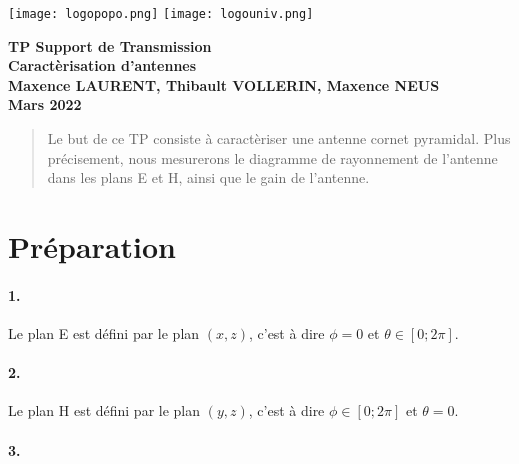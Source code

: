 \documentclass[oneside,a4paper,12pt]{article}
\begin{document}
	\begin{titlepage}
		\texttt{[image: logopopo.png]}
		\hspace*{\fill}
		\texttt{[image: logouniv.png]}
		
		\begin{center}
			\vspace{1cm}
			\textbf{TP Support de Transmission}\\
			\textbf{Caractèrisation d'antennes}\\
			\vspace{1cm}
			\textbf{Maxence LAURENT, Thibault VOLLERIN, Maxence NEUS}\\
			\vspace{3cm}
			\vspace{\fill}
			\textbf{Mars 2022}\\
		\end{center}
	\end{titlepage}
	
	\tableofcontents
	
	\vspace{5cm}
	
	\begin{abstract}
	Le but de ce TP consiste à caractèriser une antenne cornet pyramidal.
	Plus précisement, nous mesurerons le diagramme de rayonnement de l'antenne dans les plans E et H, ainsi que le gain de l'antenne. 
 	\end{abstract}

	\newpage

	\section{Préparation}
	
	\paragraph{1.} 
	Le plan E est défini par le plan $ (x, z) $, c'est à dire $ \phi = 0 $ et $ \theta \in [0; 2 \pi] $.
	
	\paragraph{2.} 
	Le plan H est défini par le plan $ (y, z) $, c'est à dire $ \phi \in [0; 2 \pi] $ et $ \theta = 0 $.
	
	\paragraph{3.}
\end{document}
